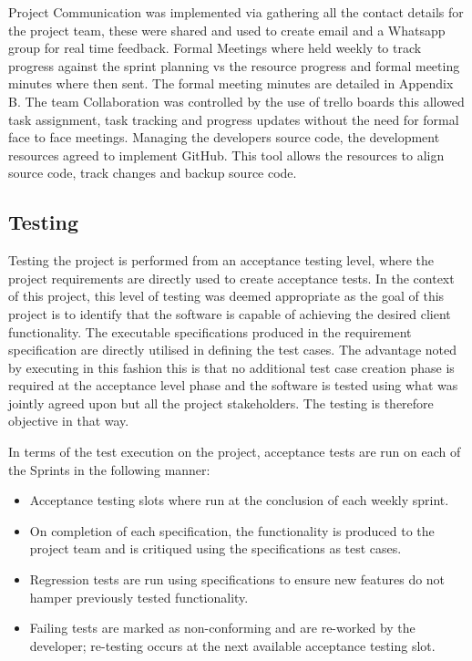 \documentclass[12pt]{witseiepaper}
\begin{document}
Project Communication was implemented via gathering all the contact details for the project team, these were shared and used to create email and a Whatsapp group for real time feedback. Formal Meetings where held weekly to track progress against the sprint planning vs the resource progress and formal meeting minutes where then sent. The formal meeting minutes are detailed in Appendix B. The team Collaboration was controlled by the use of trello boards \cite{Trello} this allowed task assignment, task tracking and progress updates without the need for formal face to face meetings. Managing the developers source code, the development resources agreed to implement GitHub.\cite{GitHubRef} This tool allows the resources to align source code, track changes and backup source code. 

\subsection{Testing}
Testing the project is performed from an acceptance testing level, where the project requirements are directly used to create acceptance tests. \cite{AcceptanceTest} In the context of this project, this level of testing was deemed appropriate as the goal of this project is to identify that the software is capable of achieving the desired client functionality.
The executable specifications produced in the requirement specification are directly utilised in defining the test cases. The advantage noted by executing in this fashion this is that no additional test case creation phase is required at the acceptance level phase and the software is tested using what was jointly agreed upon but all the project stakeholders. The testing is therefore objective in that way.

In terms of the test execution on the project, acceptance tests are run on each of the Sprints in the following manner:



\begin{itemize}
	\item Acceptance testing slots where run at the conclusion of each weekly sprint.
	\item On completion of each specification, the functionality is produced to the project team and is critiqued using the specifications as test cases.
	\item Regression tests are run using specifications to ensure new features do not hamper previously tested functionality.
	\item Failing tests are marked as non-conforming and are re-worked by the developer; re-testing occurs at the next available acceptance testing slot. 
\end{itemize}
\end{document}
